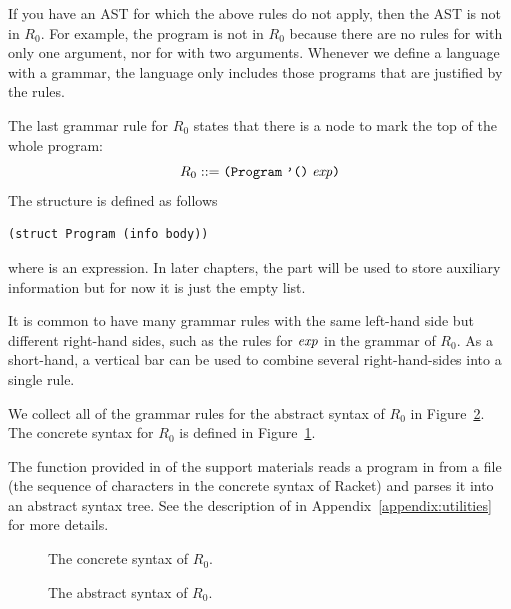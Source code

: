 \documentclass[11pt]{book}
\begin{document}
If you have an AST for which the above rules do not apply, then the
AST is not in $R_0$. For example, the program 
is not in $R_0$ because there are no rules for \code{+} with only one
argument, nor for \key{-} with two arguments. Whenever we define a
language with a grammar, the language only includes those programs
that are justified by the rules.

The last grammar rule for $R_0$ states that there is a 
node to mark the top of the whole program:
\[
  R_0 ::= \texttt{(Program}\;\texttt{'()}\;\mathit{exp}\texttt{)}
\]
The  structure is defined as follows
\begin{lstlisting}
(struct Program (info body))
\end{lstlisting}
where  is an expression. In later chapters, the 
part will be used to store auxiliary information but for now it is
just the empty list.

It is common to have many grammar rules with the same left-hand side
but different right-hand sides, such as the rules for $\mathit{exp}$ in the
grammar of $R_0$. As a short-hand, a vertical bar can be used to
combine several right-hand-sides into a single rule.

We collect all of the grammar rules for the abstract syntax of $R_0$
in Figure~\ref{fig:r0-syntax}. The concrete syntax for $R_0$ is
defined in Figure~\ref{fig:r0-concrete-syntax}.

The  function provided in  of
the support materials reads a program in from a file (the sequence of
characters in the concrete syntax of Racket) and parses it into an
abstract syntax tree. See the description of  in
Appendix~\ref{appendix:utilities} for more details.


\begin{figure}[tp]
\caption{The concrete syntax of $R_0$.}
\label{fig:r0-concrete-syntax}
\end{figure}

\begin{figure}[tp]
\caption{The abstract syntax of $R_0$.}
\label{fig:r0-syntax}
\end{figure}
\end{document}
